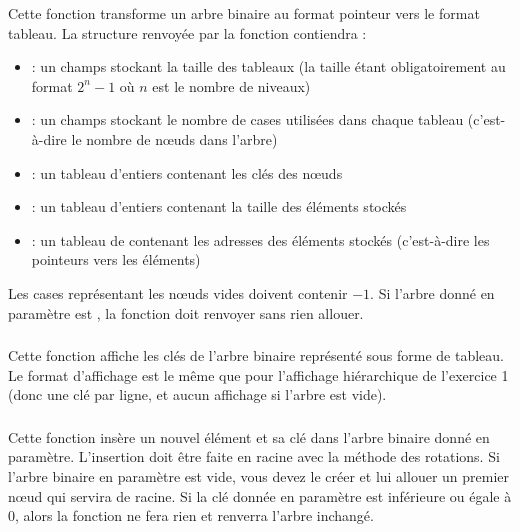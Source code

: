\noindent Cette fonction transforme un arbre binaire au format pointeur vers le format tableau.
La structure  renvoyée par la fonction contiendra :
\begin{itemize}
\item {} : un champs stockant la taille des tableaux (la taille étant obligatoirement au format $ 2^{n} - 1 $ où $ n $ est le nombre de niveaux)
\item {} : un champs stockant le nombre de cases utilisées dans chaque tableau (c'est-à-dire le nombre de nœuds dans l'arbre)
\item {} : un tableau d'entiers contenant les clés des nœuds
\item {} : un tableau d'entiers contenant la taille des éléments stockés
\item {} : un tableau de  contenant les adresses des éléments stockés (c'est-à-dire les pointeurs vers les éléments)
\end{itemize}
Les cases représentant les nœuds vides doivent contenir $ -1 $.
Si l'arbre donné en paramètre est , la fonction doit renvoyer  sans rien allouer.

\medskip


\subsubsection*{}

\noindent Cette fonction affiche les clés de l'arbre binaire représenté sous forme de tableau.
Le format d'affichage est le même que pour l'affichage hiérarchique de l'exercice 1 (donc une clé par ligne, et aucun affichage si l'arbre est vide).

\medskip

\subsubsection*{}

\noindent Cette fonction insère un nouvel élément et sa clé dans l'arbre binaire donné en paramètre.
L'insertion doit être faite en racine avec la méthode des rotations.
Si l'arbre binaire en paramètre est vide, vous devez le créer et lui allouer un premier nœud qui servira de racine.
Si la clé donnée en paramètre est inférieure ou égale à $ 0 $, alors la fonction ne fera rien et renverra l'arbre inchangé.

